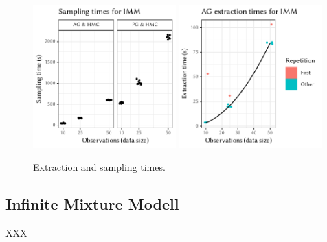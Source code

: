 \cleartoverso
\FloatBlock

\begin{figure}[t!]
  \centering
  \includegraphics[width=0.49\textwidth]{figures/IMM-sampling_times}
  \includegraphics[width=0.49\textwidth]{figures/IMM-compile_times}
  \caption{Extraction and sampling times.}
  \label{fig:plots-imm}
\end{figure}

\subsection*{Infinite Mixture Modell}

XXX


